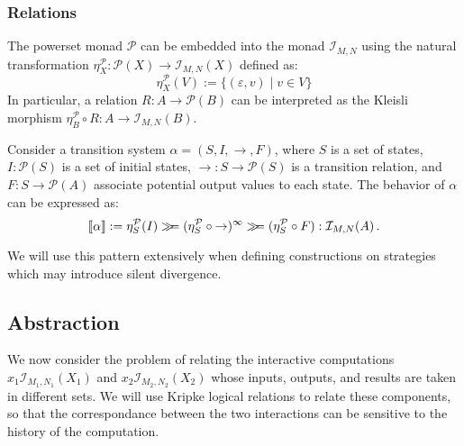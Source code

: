 
\subsubsection{Relations} %

The powerset monad $\mathcal{P}$
can be embedded into the monad $\mathcal{I}_{M,N}$
using the natural transformation
$\eta^\mathcal{P}_X : \mathcal{P}(X) \rightarrow \mathcal{I}_{M,N}(X)$
defined as:
\[
    \eta^\mathcal{P}_X(V) := \{ (\varepsilon, v) \mid v \in V \}
\]
In particular,
a relation $R : A \rightarrow \mathcal{P}(B)$
can be interpreted as the Kleisli morphism
$\eta^\mathcal{P}_B \circ R : A \rightarrow \mathcal{I}_{M,N}(B)$.

\begin{example} \label{ex:ts}
Consider a transition system $\alpha = (S, I, {\rightarrow}, F)$,
where
$S$ is a set of states,
$I : \mathcal{P}(S)$
is a set of initial states,
${\rightarrow} : S \rightarrow \mathcal{P}(S)$
is a transition relation, and
$F : S \rightarrow \mathcal{P}(A)$
associate potential output values to each state.
The behavior of $\alpha$ can be expressed as:
\[
    \llbracket \alpha \rrbracket :=
    \eta^\mathcal{P}_S(I) \gg\!\!=
    (\eta^\mathcal{P}_S \circ {\rightarrow})^\infty \gg\!\!=
    (\eta^\mathcal{P}_S \circ F)
    : \mathcal{I}_{M,N}(A) \,.
\]
\end{example}

We will use this pattern extensively
when defining constructions on strategies
which may introduce silent divergence.



\subsection{Abstraction} %

We now consider the problem of relating the interactive computations
$x_1 \mathcal{I}_{M_1,N_1}(X_1)$ and
$x_2 \mathcal{I}_{M_2,N_2}(X_2)$
whose inputs, outputs, and results are taken in different sets.
We will use Kripke logical relations to relate these components,
so that the correspondance between the two interactions
can be sensitive to the history of the computation.

